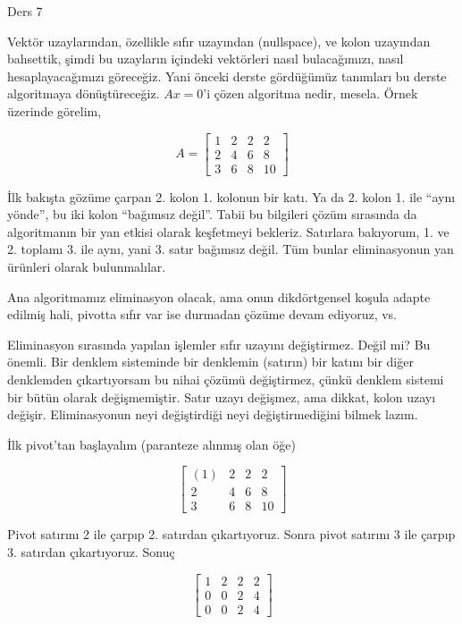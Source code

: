 \documentclass[12pt,fleqn]{article}\usepackage{../../common}
\begin{document}
Ders 7

Vektör uzaylarından, özellikle sıfır uzayından (nullspace), ve kolon
uzayından bahsettik, şimdi bu uzayların içindeki vektörleri nasıl
bulacağımızı, nasıl hesaplayacağımızı göreceğiz. Yani önceki derste
gördüğümüz tanımları bu derste algoritmaya dönüştüreceğiz. $Ax=0$'i çözen
algoritma nedir, mesela. Örnek üzerinde görelim,

$$ 
A = 
\left[\begin{array}{cccc}
1 & 2 & 2 & 2  \\
2 & 4 & 6 & 8 \\
3 & 6 & 8 & 10
\end{array}\right]
 $$

İlk bakışta gözüme çarpan 2. kolon 1. kolonun bir katı. Ya da 2. kolon
1. ile ``aynı yönde'', bu iki kolon ``bağımsız değil''. Tabii bu bilgileri
çözüm sırasında da algoritmanın bir yan etkisi olarak keşfetmeyi
bekleriz. Satırlara bakıyorum, 1. ve 2. toplamı 3. ile aynı, yani 3. satır
bağımsız değil. Tüm bunlar eliminasyonun yan ürünleri olarak bulunmalılar.

Ana algoritmamız eliminasyon olacak, ama onun dikdörtgensel koşula adapte
edilmiş hali, pivotta sıfır var ise durmadan çözüme devam ediyoruz, vs.

Eliminasyon sırasında yapılan işlemler sıfır uzayını değiştirmez. Değil mi?
Bu önemli. Bir denklem sisteminde bir denklemin (satırın) bir katını bir
diğer denklemden çıkartıyorsam bu nihai çözümü değiştirmez, çünkü denklem
sistemi bir bütün olarak değişmemiştir. Satır uzayı değişmez, ama dikkat,
kolon uzayı değişir. Eliminasyonun neyi değiştirdiği neyi değiştirmediğini
bilmek lazım. 

İlk pivot'tan başlayalım (paranteze alınmış olan öğe)

$$ 
\left[\begin{array}{cccc}
(1) & 2 & 2 & 2  \\
2 & 4 & 6 & 8 \\
3 & 6 & 8 & 10
\end{array}\right]
 $$

Pivot satırını 2 ile çarpıp 2. satırdan çıkartıyoruz. Sonra pivot satırını
3 ile çarpıp 3. satırdan çıkartıyoruz. Sonuç

$$ 
\left[\begin{array}{cccc}
1 & 2 & 2 & 2  \\
0 & 0 & 2 & 4 \\
0 & 0 & 2 & 4
\end{array}\right]
 $$
\end{document}
